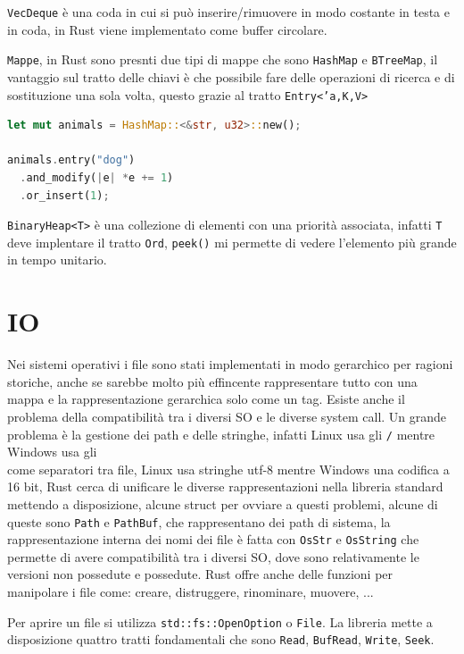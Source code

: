 \documentclass[12pt]{article}
\begin{document}
\texttt{VecDeque} \`e una coda in cui si pu\`o inserire/rimuovere in modo costante in testa e in coda, in Rust viene implementato come buffer circolare.

\texttt{Mappe}, in Rust sono presnti due tipi di mappe che sono \texttt{HashMap} e \texttt{BTreeMap}, il vantaggio sul tratto delle chiavi \`e che possibile fare delle operazioni di ricerca e di sostituzione una sola volta, questo grazie al tratto \texttt{Entry<'a,K,V>}
\begin{lstlisting}[language=rust]
let mut animals = HashMap::<&str, u32>::new();

animals.entry("dog")
  .and_modify(|e| *e += 1)
  .or_insert(1);
\end{lstlisting}

\texttt{BinaryHeap<T>} \`e una collezione di elementi con una priorit\`a associata, infatti \texttt{T} deve implentare il tratto \texttt{Ord}, \texttt{peek()} mi permette di vedere l'elemento pi\`u grande in tempo unitario.

\section{IO}
Nei sistemi operativi i file sono stati implementati in modo gerarchico per ragioni storiche, anche se sarebbe molto pi\`u effincente rappresentare tutto con una mappa e la rappresentazione gerarchica solo come un tag. Esiste anche il problema della compatibilit\`a tra i diversi SO e le diverse system call. Un grande problema \`e la gestione dei path e delle stringhe, infatti Linux usa gli \texttt{/} mentre Windows usa gli \texttt{\\} come separatori tra file, Linux usa stringhe utf-8 mentre Windows una codifica a 16 bit, Rust cerca di unificare le diverse rappresentazioni nella libreria standard mettendo a disposizione, alcune struct per ovviare a questi problemi, alcune di queste sono \texttt{Path} e \texttt{PathBuf}, che rappresentano dei path di sistema, la rappresentazione interna dei nomi dei file \`e fatta con \texttt{OsStr} e \texttt{OsString} che permette di avere compatibilit\`a tra i diversi SO, dove sono relativamente le versioni non possedute e possedute. Rust offre anche delle funzioni per manipolare i file come: creare, distruggere, rinominare, muovere, ...

Per aprire un file si utilizza \texttt{std::fs::OpenOption} o \texttt{File}. La libreria mette a disposizione quattro tratti fondamentali che sono \texttt{Read}, \texttt{BufRead}, \texttt{Write}, \texttt{Seek}.
\end{document}
